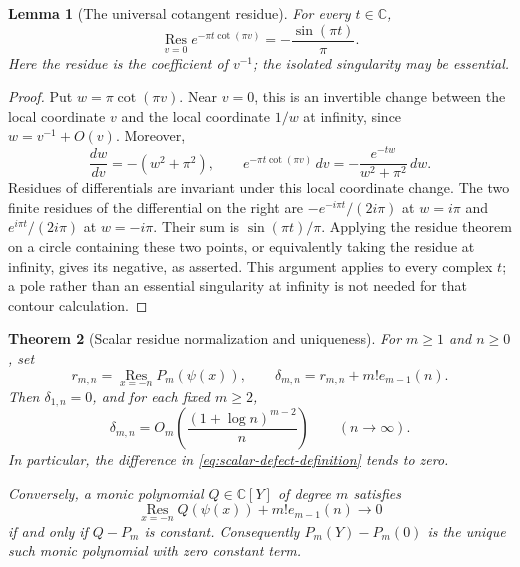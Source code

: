 \documentclass[11pt,a4paper]{article}
\numberwithin{equation}{section}
\newtheorem{theorem}{Theorem}[section]
\newtheorem{lemma}[theorem]{Lemma}
\theoremstyle{definition}
\begin{document}
\begin{lemma}[The universal cotangent residue]
\label{lem:scalar-cotangent-residue}
For every $t\in\mathbb C$,
\begin{equation}
 \operatorname*{Res}_{v=0}e^{-\pi t\cot(\pi v)}
       =-\frac{\sin(\pi t)}{\pi}.
 \label{eq:scalar-cotangent-residue}
\end{equation}
Here the residue is the coefficient of $v^{-1}$; the isolated
singularity may be essential.
\end{lemma}

\begin{proof}
Put $w=\pi\cot(\pi v)$.  Near $v=0$, this is an invertible change
between the local coordinate $v$ and the local coordinate $1/w$ at
infinity, since $w=v^{-1}+O(v)$.  Moreover,
\begin{equation}
 \frac{dw}{dv}=-(w^2+\pi^2),\qquad
 e^{-\pi t\cot(\pi v)}\,dv
       =-\frac{e^{-tw}}{w^2+\pi^2}\,dw.
 \label{eq:scalar-residue-change-variable}
\end{equation}
Residues of differentials are invariant under this local coordinate
change.  The two finite residues of the differential on the right are
$-e^{-i\pi t}/(2i\pi)$ at $w=i\pi$ and
$e^{i\pi t}/(2i\pi)$ at $w=-i\pi$.  Their sum is
$\sin(\pi t)/\pi$.  Applying the residue theorem on a circle
containing these two points, or equivalently taking the residue at
infinity, gives its negative, as asserted.  This argument applies to
every complex $t$; a pole rather than an essential singularity at
infinity is not needed for that contour calculation.
\end{proof}

\begin{theorem}[Scalar residue normalization and uniqueness]
\label{thm:scalar-gamma-normalization}
For $m\geq1$ and $n\geq0$, set
\begin{equation}
 r_{m,n}=\operatorname*{Res}_{x=-n}P_m(\psi(x)),
 \qquad
 \delta_{m,n}=r_{m,n}+m!e_{m-1}(n).
 \label{eq:scalar-defect-definition}
\end{equation}
Then $\delta_{1,n}=0$, and for each fixed $m\geq2$,
\begin{equation}
 \delta_{m,n}
   =O_m\!\left(\frac{(1+\log n)^{m-2}}{n}\right)
           \qquad(n\to\infty).
 \label{eq:scalar-defect-decay}
\end{equation}
In particular, the difference in
\eqref{eq:scalar-defect-definition} tends to zero.

Conversely, a monic polynomial $Q\in\mathbb C[Y]$ of degree $m$
satisfies
\begin{equation}
 \operatorname*{Res}_{x=-n}Q(\psi(x))+m!e_{m-1}(n)
           \longrightarrow0
 \label{eq:scalar-normalization-condition}
\end{equation}
if and only if $Q-P_m$ is constant.  Consequently
$P_m(Y)-P_m(0)$ is the unique such monic polynomial with zero
constant term.
\end{theorem}
\end{document}
